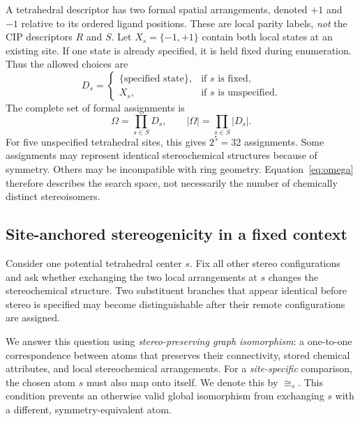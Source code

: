 \documentclass[journal=jcisd8,manuscript=article]{achemso}
\begin{document}
A tetrahedral descriptor has two formal spatial arrangements,
denoted $+1$ and $-1$ relative to its ordered ligand positions.
These are local parity labels, \emph{not} the CIP descriptors
$R$ and $S$.\cite{Hanson2018,Papusha2026}
Let $X_s=\{-1,+1\}$ contain both local states at an existing
site. If one state is already specified, it is held fixed during
enumeration. Thus the allowed choices are
\begin{equation}
D_s =
\begin{cases}
\{\text{specified state}\}, & \text{if $s$ is fixed},\\
X_s, & \text{if $s$ is unspecified}.
\end{cases}
\label{eq:domain}
\end{equation}
The complete set of formal assignments is
\begin{equation}
\Omega=\prod_{s\in S}D_s,\qquad
|\Omega|=\prod_{s\in S}|D_s|.
\label{eq:omega}
\end{equation}
For five unspecified tetrahedral sites, this gives $2^5=32$
assignments. Some assignments may represent identical
stereochemical structures because of symmetry. Others may
be incompatible with ring geometry. Equation~\ref{eq:omega}
therefore describes the search space, not necessarily the
number of chemically distinct stereoisomers.

\subsection{Site-anchored stereogenicity in a fixed context}
\label{subsec:local-test}

Consider one potential tetrahedral center $s$. Fix all
other stereo configurations and ask whether exchanging the
two local arrangements at $s$ changes the stereochemical
structure. Two substituent branches that appear identical
before stereo is specified may become distinguishable after
their remote configurations are assigned.

We answer this question using \emph{stereo-preserving graph
isomorphism}: a one-to-one correspondence between atoms
that preserves their connectivity, stored chemical attributes,
and local stereochemical arrangements.\cite{Papusha2026,Cordella2004}
For a \emph{site-specific} comparison, the chosen atom $s$
must also map onto itself. We denote this by $\cong_s$.
This condition prevents an otherwise valid global
isomorphism from exchanging $s$ with a different,
symmetry-equivalent atom.
\end{document}
